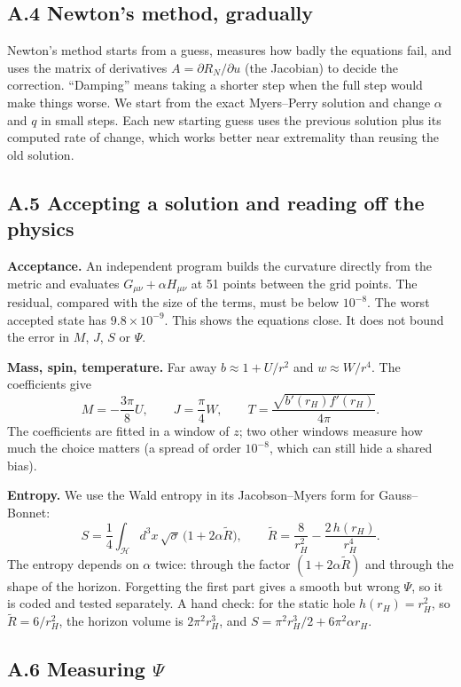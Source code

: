 \documentclass[12pt,a4paper]{article}
\begin{document}
\subsection*{A.4 Newton's method, gradually}

Newton's method starts from a guess, measures how badly the equations fail, and
uses the matrix of derivatives $A=\partial R_N/\partial u$ (the Jacobian) to decide
the correction. ``Damping'' means taking a shorter step when the full step would
make things worse. We start from the exact Myers--Perry solution and change
$\alpha$ and $q$ in small steps. Each new starting guess uses the previous solution
plus its computed rate of change, which works better near extremality than reusing
the old solution.

\subsection*{A.5 Accepting a solution and reading off the physics}

\textbf{Acceptance.} An independent program builds the curvature directly from the
metric and evaluates $G_{\mu\nu}+\alpha H_{\mu\nu}$ at 51 points between the grid
points. The residual, compared with the size of the terms, must be below $10^{-8}$.
The worst accepted state has $9.8\times10^{-9}$. This shows the equations close. It
does not bound the error in $M$, $J$, $S$ or $\Psi$.

\textbf{Mass, spin, temperature.} Far away $b\approx1+U/r^2$ and $w\approx W/r^4$.
The coefficients give
\[
M=-\frac{3\pi}{8}U,\qquad J=\frac{\pi}{4}W,\qquad T=\frac{\sqrt{b'(r_H)f'(r_H)}}{4\pi}.
\]
The coefficients are fitted in a window of $z$; two other windows measure how much
the choice matters (a spread of order $10^{-8}$, which can still hide a shared bias).

\textbf{Entropy.} We use the Wald entropy in its Jacobson--Myers form for
Gauss--Bonnet:
\[
S=\frac14\int_{\mathcal H}d^3x\,\sqrt{\sigma}\,\bigl(1+2\alpha\tilde R\bigr),\qquad
\tilde R=\frac{8}{r_H^2}-\frac{2\,h(r_H)}{r_H^4}.
\]
The entropy depends on $\alpha$ twice: through the factor $(1+2\alpha\tilde R)$ and
through the shape of the horizon. Forgetting the first part gives a smooth but wrong
$\Psi$, so it is coded and tested separately. A hand check: for the static hole
$h(r_H)=r_H^2$, so $\tilde R=6/r_H^2$, the horizon volume is $2\pi^2r_H^3$, and
$S=\pi^2r_H^3/2+6\pi^2\alpha r_H$.

\subsection*{A.6 Measuring $\Psi$}
\end{document}
